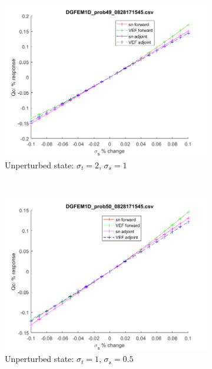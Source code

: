 \documentclass{article}
\newcommand{\sigt}{\sigma_t}
\newcommand{\sigs}{\sigma_s}
\begin{document}
\begin{figure}[H]
\label{InHomoPerts}
\centering
\begin{subfigure}{.65\textwidth}
  \centering
  \includegraphics[width=.98\linewidth]{figures/49sigsSens.png}
  \caption{Unperturbed state: $\sigt=2$, $\sigs=1$}
  \label{fig:sfig1}
\end{subfigure}%
\\
\begin{subfigure}{.65\textwidth}
  \centering
  \includegraphics[width=.98\linewidth]{figures/50sigsSens.png}
  \caption{Unperturbed state: $\sigt=1$, $\sigs=0.5$}
  \label{fig:sfig2}
\end{subfigure}
\\
\begin{subfigure}{.65\textwidth}

\end{subfigure}
\end{figure}
\end{document}
